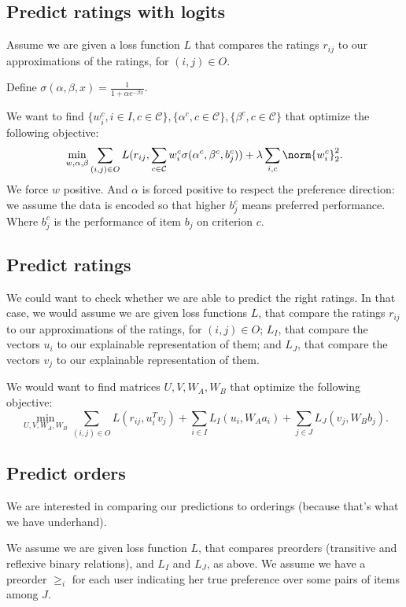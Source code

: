 \documentclass[french, english]{da2pl2018}
\begin{document}
\subsection{Predict ratings with logits}
Assume we are given a loss function $L$ that compares the ratings $r_{ij}$ to our approximations of the ratings, for $(i, j) \in O$.

Define $\sigma(\alpha, \beta, x) = \frac{1}{1+\alpha e^{-\beta x}}$.

We want to find $\{w_i^c, i \in I, c \in \mathcal{C}\}, \{\alpha^c, c \in \mathcal{C}\}, \{\beta^c, c \in \mathcal{C}\}$ that optimize the following objective:
\begin{equation}
\min_{w, \alpha, \beta} \sum_{(i, j) \in O} L(r_{ij}, \sum_{c \in \mathcal{C}} w_i^c \sigma(\alpha^c, \beta^c, b_j^c)) + \lambda \sum_{i, c} \norm{w_i^c}_2^2.
\end{equation}
We force $w$ positive. And $\alpha$ is forced positive to respect the preference direction: we assume the data is encoded so that higher $b_j^c$ means preferred performance. Where $b_j^c$ is the performance of item $b_j$ on criterion $c$.

\subsection{Predict ratings}
We could want to check whether we are able to predict the right ratings. In that case, we would assume we are given loss functions $L$, that compare the ratings $r_{ij}$ to our approximations of the ratings, for $(i, j) \in O$; $L_I$, that compare the vectors $u_i$ to our explainable representation of them; and $L_J$, that compare the vectors $v_j$ to our explainable representation of them.

We would want to find matrices $U, V, W_A, W_B$ that optimize the following objective:
\begin{equation}
\min_{U, V, W_A, W_B} \sum_{(i, j) \in O} L(r_{ij}, u_i^T v_j) + \sum_{i \in I} L_I(u_i, W_A a_i) + \sum_{j \in J} L_J(v_j, W_B b_j).
\end{equation}

\subsection{Predict orders}
We are interested in comparing our predictions to orderings (because that’s what we have underhand).

We assume we are given loss function $L$, that compares preorders (transitive and reflexive binary relations), and $L_I$ and $L_J$, as above. We assume we have a preorder $≥_i$ for each user indicating her true preference over some pairs of items among $J$.
\end{document}
